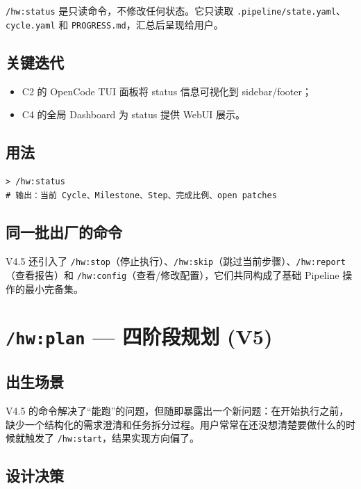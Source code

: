 \documentclass[
  outputdir=build,
  chapterstyle=cn,
  colorscheme=Simple,
  fontset=tech,
  code=false
]{Hypo-Note}
\begin{document}
\texttt{/hw:status} 是只读命令，不修改任何状态。它只读取 \texttt{.pipeline/state.yaml}、\texttt{cycle.yaml} 和 \texttt{PROGRESS.md}，汇总后呈现给用户。

\subsection{关键迭代}

\begin{itemize}[leftmargin=2em]
  \item C2 的 OpenCode TUI 面板将 status 信息可视化到 sidebar/footer；
  \item C4 的全局 Dashboard 为 status 提供 WebUI 展示。
\end{itemize}

\subsection{用法}

\begin{lstlisting}[caption=查看当前进度]
> /hw:status
# 输出：当前 Cycle、Milestone、Step、完成比例、open patches
\end{lstlisting}

\subsection{同一批出厂的命令}

V4.5 还引入了 \texttt{/hw:stop}（停止执行）、\texttt{/hw:skip}（跳过当前步骤）、\texttt{/hw:report}（查看报告）和 \texttt{/hw:config}（查看/修改配置），它们共同构成了基础 Pipeline 操作的最小完备集。

\section{\texttt{/hw:plan} — 四阶段规划 (V5)}

\subsection{出生场景}

V4.5 的命令解决了“能跑”的问题，但随即暴露出一个新问题：在开始执行之前，缺少一个结构化的需求澄清和任务拆分过程。用户常常在还没想清楚要做什么的时候就触发了 \texttt{/hw:start}，结果实现方向偏了。

\subsection{设计决策}
\end{document}
